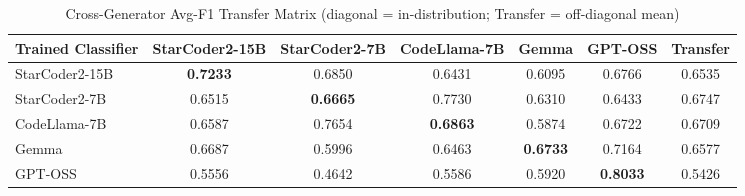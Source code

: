 \begin{table}[htbp]
\centering
\caption{Cross-Generator Avg-F1 Transfer Matrix (diagonal = in-distribution; Transfer = off-diagonal mean)}
\label{tab:cross_generator_avg_f1}
\begin{tabular}{l|ccccc|c}
\hline
\textbf{Trained Classifier} & \textbf{StarCoder2-15B} & \textbf{StarCoder2-7B} & \textbf{CodeLlama-7B} & \textbf{Gemma} & \textbf{GPT-OSS} & \textbf{Transfer} \\ \hline
StarCoder2-15B   & \textbf{0.7233} & 0.6850 & 0.6431 & 0.6095 & 0.6766 & 0.6535 \\
StarCoder2-7B    & 0.6515 & \textbf{0.6665} & 0.7730 & 0.6310 & 0.6433 & 0.6747 \\
CodeLlama-7B     & 0.6587 & 0.7654 & \textbf{0.6863} & 0.5874 & 0.6722 & 0.6709 \\
Gemma            & 0.6687 & 0.5996 & 0.6463 & \textbf{0.6733} & 0.7164 & 0.6577 \\
GPT-OSS          & 0.5556 & 0.4642 & 0.5586 & 0.5920 & \textbf{0.8033} & 0.5426 \\
\hline
\end{tabular}
\end{table}
